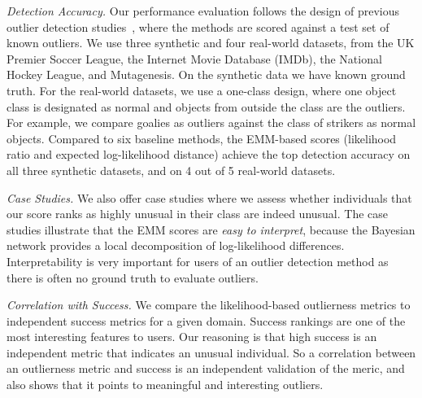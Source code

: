 {{\em Detection Accuracy.} Our performance evaluation follows the design of previous outlier detection studies~\citep{Gao2010,aggarwal2013},
where the methods are scored against a test set of known outliers.  
%
We use three synthetic and four real-world datasets, from the UK Premier Soccer League, the Internet Movie Database (IMDb), the National Hockey League, and Mutagenesis. On the synthetic data we have known ground truth. For the real-world datasets, we use a one-class design, where one object class is designated as normal and objects from outside the class are the outliers. For example, we compare goalies as outliers against the class of strikers as normal objects. 
Compared to six baseline methods, the EMM-based scores (likelihood ratio and expected log-likelihood distance) achieve the top detection accuracy on all three synthetic datasets, and on 4 out of 5 real-world datasets.

{\em Case Studies.} We also offer case studies where we assess whether individuals that our score ranks as highly unusual in their class are  indeed unusual. 
The case studies illustrate that the EMM scores are {\em easy to interpret}, because the Bayesian network provides a local decomposition of log-likelihood differences. Interpretability is very important for users of an outlier detection method as there is often no ground truth to 
evaluate outliers.%

{\em Correlation with Success.} We compare the likelihood-based outlierness metrics to independent success metrics for a given domain. Success rankings are one of the most interesting features to users. Our reasoning is that high success is an independent metric that indicates an unusual individual. So a correlation between an outlierness metric and success is an independent validation of the meric, and also shows that it points to meaningful and interesting outliers.

}
